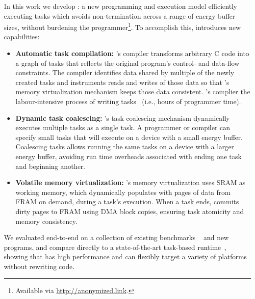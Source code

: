 In this work we develop {\bf \sys}: a new programming and execution model efficiently executing tasks which avoids non-termination across a range of energy buffer sizes, without burdening the programmer\footnote{Available via \href{http://anonymized.link}{http://anonymized.link}.}. To accomplish this, \sys introduces new capabilities: 

\begin{itemize}
	\item {\bf Automatic task compilation:} \sys's compiler transforms arbitrary C code into a graph of tasks that reflects the original program's control- and data-flow constraints. The compiler identifies data shared by multiple of the newly created tasks and instruments reads and writes of those data so that \sys's memory virtualization mechanism keeps those data consistent. \sys's complier the labour-intensive process of writing tasks~\cite{chain,alpaca} (i.e., hours of programmer time).
	\item {\bf Dynamic task coalescing:} \sys's task coalescing mechanism dynamically executes multiple tasks as a single task. A programmer or compiler can specify small tasks that will execute on a device with a small energy buffer. Coalescing tasks allows running the same tasks on a device with a larger energy buffer, avoiding run time overheads associated with ending one task and beginning another.
	\item {\bf Volatile memory virtualization:} \sys's memory virtualization uses SRAM as working memory, which \sys dynamically populates with pages of data from FRAM on demand, during a task's execution. When a task ends, \sys commits dirty pages to FRAM using DMA block copies, ensuring task atomicity and memory consistency.
\end{itemize}

We evaluated \sys end-to-end on a collection of existing benchmarks ~\cite{chain} and new programs, and compare directly to a state-of-the-art task-based runtime~\cite{chain}, showing that \sys has high performance and can flexibly target a variety of platforms without rewriting code.


